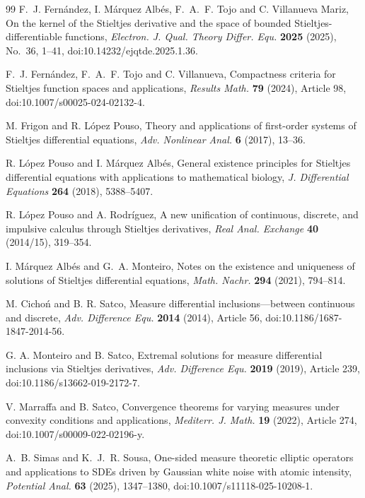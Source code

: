 \documentclass[preprint,12pt]{elsarticle}
\newcommand{\finalrev}[1]{{\color{red}#1}}
\newcommand{\finalrev}[1]{#1}
\theoremstyle{definition}
\theoremstyle{remark}
\begin{document}
\begin{thebibliography}{99}
F.~J. Fern\'andez, I. M\'arquez Alb\'es, F.~A.~F. Tojo and C. Villanueva Mariz,
On the kernel of the Stieltjes derivative and the space of bounded Stieltjes-differentiable functions,
\emph{Electron. J. Qual. Theory Differ. Equ.} \textbf{2025} (2025), No.~36, 1--41,
doi:10.14232/ejqtde.2025.1.36.

F.~J. Fern\'andez, F.~A.~F. Tojo and C. Villanueva,
Compactness criteria for Stieltjes function spaces and applications,
\emph{Results Math.} \textbf{79} (2024), Article 98, doi:10.1007/s00025-024-02132-4.

M. Frigon and R. L\'opez Pouso,
Theory and applications of first-order systems of Stieltjes differential equations,
\emph{Adv. Nonlinear Anal.} \textbf{6} (2017), 13--36.

R. L\'opez Pouso and I. M\'arquez Alb\'es,
General existence principles for Stieltjes differential equations with applications to mathematical biology,
\emph{J. Differential Equations} \textbf{264} (2018), 5388--5407.

R. L\'opez Pouso and A. Rodr\'iguez,
A new unification of continuous, discrete, and impulsive calculus through Stieltjes derivatives,
\emph{Real Anal. Exchange} \textbf{40} (2014/15), \finalrev{319--354}.

I. M\'arquez Alb\'es and G.~A. Monteiro,
Notes on the existence and uniqueness of solutions of Stieltjes differential equations,
\emph{Math. Nachr.} \textbf{294} (2021), 794--814.

M. Cicho\'n and B. R. Satco,
Measure differential inclusions---between continuous and discrete,
\emph{Adv. Difference Equ.} \textbf{2014} (2014), Article 56,
doi:10.1186/1687-1847-2014-56.

G. A. Monteiro and B. Satco,
Extremal solutions for measure differential inclusions via Stieltjes derivatives,
\emph{Adv. Difference Equ.} \textbf{2019} (2019), Article 239,
doi:10.1186/s13662-019-2172-7.

V. Marraffa and B. Satco,
Convergence theorems for varying measures under convexity conditions and applications,
\emph{Mediterr. J. Math.} \textbf{19} (2022), Article 274,
doi:10.1007/s00009-022-02196-y.

A.~B. Simas and K.~J.~R. Sousa,
One-sided measure theoretic elliptic operators and applications to SDEs driven by Gaussian white noise with atomic intensity,
\emph{Potential Anal.} \textbf{63} (2025), 1347--1380, doi:10.1007/s11118-025-10208-1.

\end{thebibliography}
\end{document}

